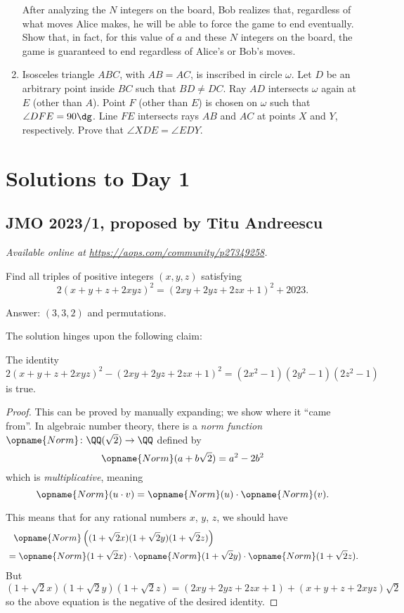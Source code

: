 \documentclass[11pt]{scrartcl}
\begin{document}
\begin{enumerate}[\bfseries 1.]
After analyzing the $N$ integers on the board, Bob realizes that,
regardless of what moves Alice makes,
he will be able to force the game to end eventually.
Show that, in fact, for this value of $a$ and these $N$ integers on the board,
the game is guaranteed to end regardless of Alice's or Bob's moves.

\item %
Isosceles triangle $ABC$, with $AB=AC$, is inscribed in circle $\omega$.
Let $D$ be an arbitrary point inside $BC$ such that $BD \neq DC$.
Ray $AD$ intersects $\omega$ again at $E$ (other than $A$).
Point $F$ (other than $E$) is chosen on $\omega$ such that $\angle DFE = 90\dg$.
Line $FE$ intersects rays $AB$ and $AC$ at points $X$ and $Y$, respectively.
Prove that $\angle XDE = \angle EDY$.

\end{enumerate}
\pagebreak

\section{Solutions to Day 1}
\subsection{JMO 2023/1, proposed by Titu Andreescu}
\textsl{Available online at \url{https://aops.com/community/p27349258}.}
\begin{mdframed}[style=mdpurplebox,frametitle={Problem statement}]
Find all triples of positive integers $(x,y,z)$ satisfying
\[ 2(x+y+z+2xyz)^2 = (2xy+2yz+2zx+1)^2 + 2023. \]
\end{mdframed}
Answer: $(3,3,2)$ and permutations.

The solution hinges upon the following claim:
\begin{claim*}
   The identity
   \[ 2(x+y+z+2xyz)^2 - (2xy+2yz+2zx+1)^2 = (2x^2-1)(2y^2-1)(2z^2-1) \]
   is true.
\end{claim*}
\begin{proof}
  This can be proved by manually expanding; we show where it ``came from''.
  In algebraic number theory, there is a \emph{norm function}
  $\opname{Norm} \colon \QQ(\sqrt2) \to \QQ$
  defined by
  \[ \opname{Norm}(a+b\sqrt2) = a^2-2b^2 \]
  which is \emph{multiplicative}, meaning
  \[ \opname{Norm}(u \cdot v) = \opname{Norm}(u) \cdot \opname{Norm}(v). \]

  This means that for any rational numbers $x$, $y$, $z$, we should have
  \begin{align*}
    &\phantom{=} \opname{Norm}
    \left( (1+\sqrt2x)(1+\sqrt2y)(1+\sqrt2z) \right) \\
    &= \opname{Norm}(1+\sqrt2x)
      \cdot \opname{Norm}(1+\sqrt2y)
      \cdot \opname{Norm}(1+\sqrt2z).
  \end{align*}
  But $(1+\sqrt2x)(1+\sqrt2y)(1+\sqrt2z) = (2xy+2yz+2zx+1) + (x+y+z+2xyz)\sqrt2$
  so the above equation is the negative of the desired identity.
\end{proof}
\end{document}
